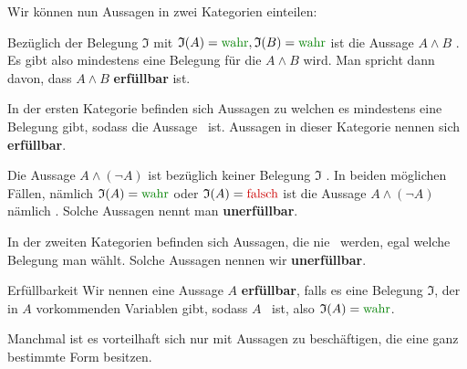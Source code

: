 \documentclass[../../main.tex]{subfiles}
\begin{document}
    Wir können nun Aussagen in zwei Kategorien einteilen:
    \begin{example}{}
        Bezüglich der Belegung $\mathfrak{I}$ mit 
        $\mathfrak{I}(A) = \wahr, \mathfrak{I}(B) = \wahr$ ist die Aussage 
        $A \land B$ \wahr. Es gibt also mindestens eine Belegung für die 
        $A \land B$ \wahr  wird. Man spricht dann davon, 
        dass $A \land B$ \textbf{erfüllbar}
        ist.
    \end{example}
    In der ersten Kategorie befinden sich Aussagen zu welchen 
    es mindestens eine Belegung gibt, sodass die Aussage \wahr\ ist. Aussagen in 
    dieser Kategorie nennen sich \textbf{erfüllbar}.

    \begin{example}{}
        Die Aussage $A \land (\lnot A)$ ist bezüglich keiner Belegung 
        $\mathfrak{I}$ \wahr. In beiden möglichen Fällen, nämlich 
        $\mathfrak{I}(A) = \wahr$ oder $\mathfrak{I}(A) = \falsch$ ist die 
        Aussage $A \land (\lnot A)$ nämlich \falsch. Solche Aussagen nennt man \textbf{unerfüllbar}.
    \end{example}
    In der zweiten Kategorien befinden sich Aussagen, die nie \wahr\ werden, egal 
    welche Belegung man wählt. Solche Aussagen nennen wir \textbf{unerfüllbar}.

    \begin{definition}{Erfüllbarkeit}
        Wir nennen eine Aussage $A$ \textbf{erfüllbar}, falls es eine 
        Belegung $\mathfrak{I}$, der in $A$ vorkommenden Variablen gibt, 
        sodass $A$ \wahr\ ist, also $\mathfrak{I}(A) = \wahr$.
    \end{definition}

    \newpage


    Manchmal ist es vorteilhaft sich nur mit Aussagen zu beschäftigen, 
    die eine ganz bestimmte Form besitzen.
\end{document}
